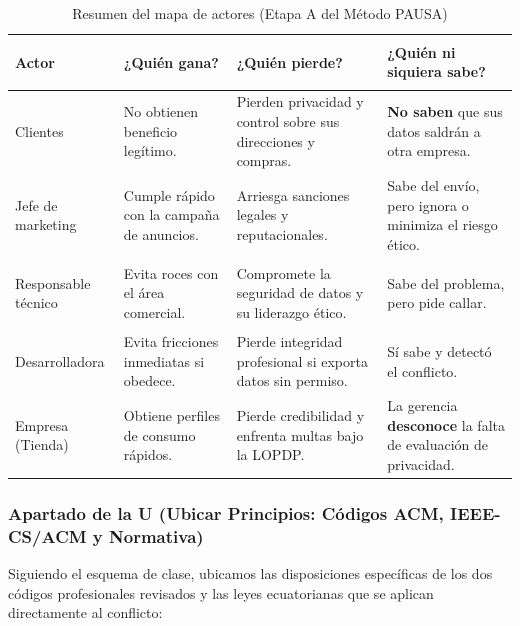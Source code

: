 \documentclass[12pt,a4paper,oneside]{article}
\begin{document}
\begin{table}[H]\centering
\caption{Resumen del mapa de actores (Etapa A del Método PAUSA)}\label{tab:actores}
\small\renewcommand{\arraystretch}{1.3}
\begin{tabularx}{\linewidth}{@{}>{\bfseries\raggedright\arraybackslash}p{2.9cm} >{\raggedright\arraybackslash}X >{\raggedright\arraybackslash}X >{\raggedright\arraybackslash}p{3.0cm}@{}}
\toprule
\textbf{Actor} & \textbf{¿Quién gana?} & \textbf{¿Quién pierde?} & \textbf{¿Quién ni siquiera sabe?} \\
\midrule
Clientes & No obtienen beneficio legítimo. & Pierden privacidad y control sobre sus direcciones y compras. & \textbf{No saben} que sus datos saldrán a otra empresa. \\
Jefe de marketing & Cumple rápido con la campaña de anuncios. & Arriesga sanciones legales y reputacionales. & Sabe del envío, pero ignora o minimiza el riesgo ético. \\
Responsable técnico & Evita roces con el área comercial. & Compromete la seguridad de datos y su liderazgo ético. & Sabe del problema, pero pide callar. \\
Desarrolladora & Evita fricciones inmediatas si obedece. & Pierde integridad profesional si exporta datos sin permiso. & Sí sabe y detectó el conflicto. \\
Empresa (Tienda) & Obtiene perfiles de consumo rápidos. & Pierde credibilidad y enfrenta multas bajo la LOPDP. & La gerencia \textbf{desconoce} la falta de evaluación de privacidad. \\
\bottomrule
\end{tabularx}
\end{table}

\subsubsection{Apartado de la U (Ubicar Principios: Códigos ACM, IEEE-CS/ACM y Normativa)}
Siguiendo el esquema de clase, ubicamos las disposiciones específicas de los dos códigos profesionales revisados y las leyes ecuatorianas que se aplican directamente al conflicto:
\end{document}

